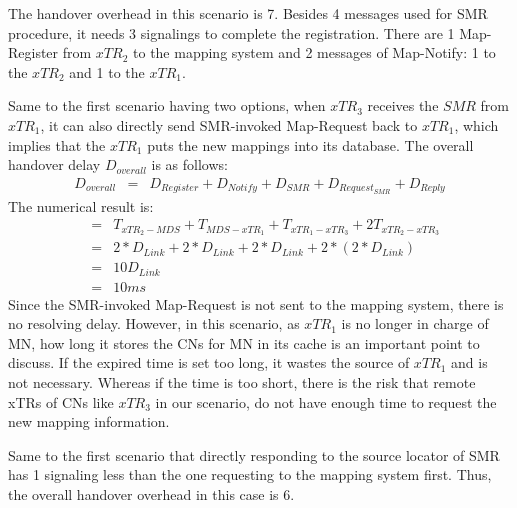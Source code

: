 The handover overhead in this scenario is 7. Besides 4 messages used for SMR procedure, it needs 3 signalings to complete the registration. There are 1 Map-Register from $xTR_2$ to the mapping system and 2 messages of Map-Notify: 1 to the $xTR_2$ and 1 to the $xTR_1$.

Same to the first scenario having two options, when $xTR_3$ receives the $SMR$ from $xTR_1$, it can also directly send SMR-invoked Map-Request back to $xTR_1$, which implies that the $xTR_1$ puts the new mappings into its database. The overall handover delay $D_{overall}$ is as follows:
\begin{eqnarray}
D_{overall} &=& D_{Register} + D_{Notify} + D_{SMR} + D_{Request_{SMR}} + D_{Reply}
\end{eqnarray}
The numerical result is:
\begin{eqnarray}
&=& T_{xTR_2-MDS} + T_{MDS-xTR_1} + T_{xTR_1-xTR_3} + 2T_{xTR_2-xTR_3} \nonumber \\
&=& 2*D_{Link} + 2*D_{Link} + 2*D_{Link} + 2*(2*D_{Link}) \nonumber \\
&=& 10D_{Link}  \nonumber \\
&=& 10 ms \nonumber
\end{eqnarray}
Since the SMR-invoked Map-Request is not sent to the mapping system, there is no resolving delay. %
However, in this scenario, as $xTR_1$ is no longer in charge of MN, how long it stores the CNs for MN in its cache is an important point to discuss. If the expired time is set too long, it wastes the source of $xTR_1$ and is not necessary. Whereas if the time is too short, there is the risk that remote xTRs of CNs like $xTR_3$ in our scenario, do not have enough time to request the new mapping information.

Same to the first scenario that directly responding to the source locator of SMR has 1 signaling less than the one requesting to the mapping system first. Thus, the overall handover overhead in this case is 6.

